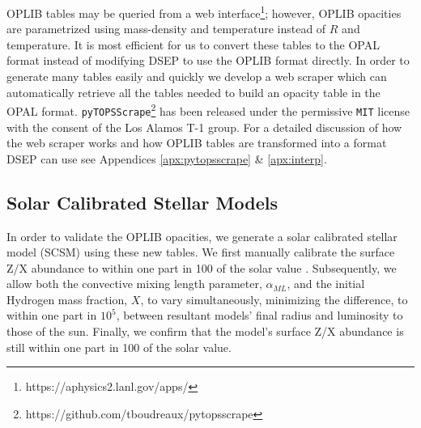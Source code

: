 OPLIB tables may be queried from a web
interface\footnote{https://aphysics2.lanl.gov/apps/}; however, OPLIB opacities
are parametrized using mass-density and temperature instead of $R$ and
temperature. It is most efficient for us to convert these tables to the OPAL
format instead of modifying DSEP to use the OPLIB format directly. In order to
generate many tables easily and quickly we develop a web scraper
\citep[\texttt{pyTOPSScrape},][]{Boudreaux22pyTOPS} which can automatically retrieve
all the tables needed to build an opacity table in the OPAL format.
\texttt{pyTOPSScrape}\footnote{https://github.com/tboudreaux/pytopsscrape} has
been released under the permissive \texttt{MIT} license with the consent of the
Los Alamos T-1 group. For a detailed discussion of how the web scraper works
and how OPLIB tables are transformed into a format DSEP can use see Appendices
\ref{apx:pytopsscrape} \& \ref{apx:interp}.

\subsection{Solar Calibrated Stellar Models}\label{sec:SCSM}


In order to validate the OPLIB opacities, we generate a solar calibrated
stellar model (SCSM) using these new tables. We first manually calibrate the
surface Z/X abundance to within one part in 100 of the solar value \citep[][Z/X=0.23]{Grevesse1998}.
Subsequently, we allow both the convective mixing length parameter,
$\alpha_{ML}$, and the initial Hydrogen mass fraction, $X$, to vary
simultaneously, minimizing the difference, to within one part in $10^{5}$,
between resultant models' final radius and luminosity to those of the sun.
Finally, we confirm that the model's surface Z/X abundance is still within one
part in 100 of the solar value.

